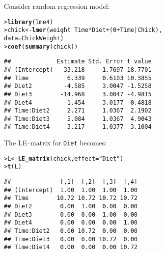 \documentclass[11pt]{article}\usepackage[]{graphicx}\usepackage[]{color}
\makeatletter
\newcommand{\hlnum}[1]{\textcolor[rgb]{0.686,0.059,0.569}{#1}}%
\newcommand{\hlstr}[1]{\textcolor[rgb]{0.192,0.494,0.8}{#1}}%
\newcommand{\hlopt}[1]{\textcolor[rgb]{0,0,0}{#1}}%
\newcommand{\hlstd}[1]{\textcolor[rgb]{0.345,0.345,0.345}{#1}}%
\newcommand{\hlkwb}[1]{\textcolor[rgb]{0.69,0.353,0.396}{#1}}%
\newcommand{\hlkwc}[1]{\textcolor[rgb]{0.333,0.667,0.333}{#1}}%
\newcommand{\hlkwd}[1]{\textcolor[rgb]{0.737,0.353,0.396}{\textbf{#1}}}%
\newenvironment{kframe}{%
 \def\at@end@of@kframe{}%
 \ifinner\ifhmode%
  \def\at@end@of@kframe{\end{minipage}}%
  \begin{minipage}{\columnwidth}%
 \fi\fi%
 \def\FrameCommand##1{\hskip\@totalleftmargin \hskip-\fboxsep
 \colorbox{shadecolor}{##1}\hskip-\fboxsep
     \hskip-\linewidth \hskip-\@totalleftmargin \hskip\columnwidth}%
 \MakeFramed {\advance\hsize-\width
   \@totalleftmargin\z@ \linewidth\hsize
   \@setminipage}}%
 {\par\unskip\endMakeFramed%
 \at@end@of@kframe}
\newenvironment{knitrout}{}{} %
\def\cc#1{\texttt{#1}}
\renewenvironment{knitrout}{
  \begin{oldknitrout}
    \footnotesize
    \topsep=0pt
}{
  \end{oldknitrout}
}
\makeatother
\begin{document}
Consider random regression model:
\begin{knitrout}
\color{fgcolor}\begin{kframe}
\begin{alltt}
\hlstd{> }\hlkwd{library}\hlstd{(lme4)}
\hlstd{> }\hlstd{chick} \hlkwb{<-} \hlkwd{lmer}\hlstd{(weight} \hlopt{~} \hlstd{Time} \hlopt{*} \hlstd{Diet} \hlopt{+} \hlstd{(}\hlnum{0} \hlopt{+} \hlstd{Time} \hlopt{|} \hlstd{Chick),}
\hlstd{  }           \hlkwc{data}\hlstd{=ChickWeight)}
\hlstd{> }\hlkwd{coef}\hlstd{(}\hlkwd{summary}\hlstd{(chick))}
\end{alltt}
\begin{verbatim}
##             Estimate Std. Error t value
## (Intercept)   33.218     1.7697 18.7701
## Time           6.339     0.6103 10.3855
## Diet2         -4.585     3.0047 -1.5258
## Diet3        -14.968     3.0047 -4.9815
## Diet4         -1.454     3.0177 -0.4818
## Time:Diet2     2.271     1.0367  2.1902
## Time:Diet3     5.084     1.0367  4.9043
## Time:Diet4     3.217     1.0377  3.1004
\end{verbatim}
\end{kframe}
\end{knitrout}


The LE--matrix for \cc{Diet} becomes:
\begin{knitrout}
\color{fgcolor}\begin{kframe}
\begin{alltt}
\hlstd{> }\hlstd{L} \hlkwb{<-} \hlkwd{LE_matrix}\hlstd{(chick,} \hlkwc{effect}\hlstd{=}\hlstr{"Diet"}\hlstd{)}
\hlstd{> }\hlkwd{t}\hlstd{(L)}
\end{alltt}
\begin{verbatim}
##              [,1]  [,2]  [,3]  [,4]
## (Intercept)  1.00  1.00  1.00  1.00
## Time        10.72 10.72 10.72 10.72
## Diet2        0.00  1.00  0.00  0.00
## Diet3        0.00  0.00  1.00  0.00
## Diet4        0.00  0.00  0.00  1.00
## Time:Diet2   0.00 10.72  0.00  0.00
## Time:Diet3   0.00  0.00 10.72  0.00
## Time:Diet4   0.00  0.00  0.00 10.72
\end{verbatim}
\end{kframe}
\end{knitrout}
\end{document}
